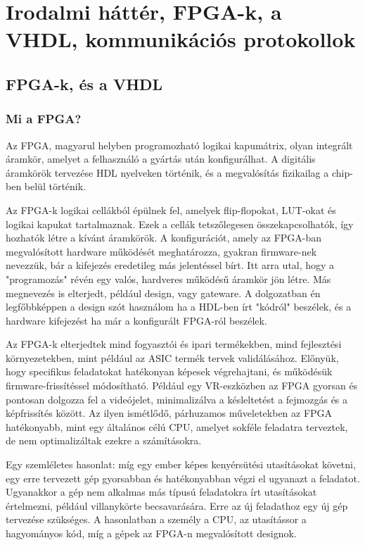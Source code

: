 \documentclass[a4paper,12pt,oneside]{book}
\begin{document}
\chapter{Irodalmi háttér, FPGA-k, a VHDL, kommunikációs protokollok}
\section{FPGA-k, és a VHDL}
\subsection{Mi a FPGA?}

Az FPGA, magyarul helyben programozható logikai kapumátrix, olyan integrált áramkör, amelyet a felhasználó a gyártás után konfigurálhat. A digitális áramkörök tervezése HDL nyelveken történik, és a megvalósítás fizikailag a chip-ben belül történik.

Az FPGA-k logikai cellákból épülnek fel, amelyek flip-flopokat, LUT-okat és logikai kapukat tartalmaznak. Ezek a cellák tetszőlegesen összekapcsolhatók, így hozhatók létre a kívánt áramkörök. A konfigurációt, amely az FPGA-ban megvalósított hardware működését meghatározza, gyakran firmware-nek nevezzük, bár a kifejezés eredetileg más jelentéssel bírt. Itt arra utal, hogy a "programozás" révén egy valós, hardveres működésű áramkör jön létre. Más megnevezés is elterjedt, például design, vagy gateware. A dolgozatban én legfőbbképpen a design szót használom ha a HDL-ben írt "kódról" beszélek, és a hardware kifejezést ha már a konfigurált FPGA-ról beszélek. 

Az FPGA-k elterjedtek mind fogyasztói és ipari termékekben, mind fejlesztési környezetekben, mint például az ASIC termék tervek validálásához. Előnyük, hogy specifikus feladatokat hatékonyan képesek végrehajtani, és működésük firmware-frissítéssel módosítható. Például egy VR-eszközben az FPGA gyorsan és pontosan dolgozza fel a videójelet, minimalizálva a késleltetést a fejmozgás és a képfrissítés között. Az ilyen ismétlődő, párhuzamos műveletekben az FPGA hatékonyabb, mint egy általános célú CPU, amelyet sokféle feladatra terveztek, de nem optimalizáltak ezekre a számításokra.

Egy szemléletes hasonlat: míg egy ember képes kenyérsütési utasításokat követni, egy erre tervezett gép gyorsabban és hatékonyabban végzi el ugyanazt a feladatot. Ugyanakkor a gép nem alkalmas más típusú feladatokra írt utasításokat értelmezni, például villanykörte becsavarására. Erre az új feladathoz egy új gép tervezése szükséges. A hasonlatban a személy a CPU, az utasítássor a hagyományos kód, míg a gépek az FPGA-n megvalósított designok.
\end{document}
